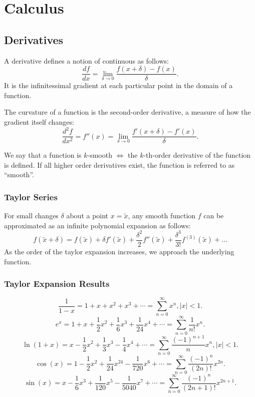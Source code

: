 \section{Calculus}
\subsection{Derivatives}
\begin{definition}[Derivatives]
  A derivative defines a notion of continuous as follows:
  \[\frac{df}{dx} = \lim_{\delta \rightarrow 0} \frac{f(x+\delta) - f(x)}{\delta}.\] 
  It is the infinitessimal gradient at each particular point in the domain of a
  function.
\end{definition}
\begin{definition}[Curvature]
  The curvature of a function is the second-order derivative, a measure of how
  the gradient itself changes:
  \[\frac{d^2f}{dx^2} = f''(x) = \lim_{\delta \rightarrow 0} \frac{f'(x+\delta) - f'(x)}{\delta}.\] 
\end{definition}
\begin{definition}[Smoothness]
  We say that a function is $k$-smooth $\iff$ the $k$-th-order derivative of
  the function is defined. If all higher order derivatives exist, the function
  is referred to as ``smooth''.
\end{definition}

\subsubsection{Taylor Series}
For small changes $\delta$ about a point $x=\tilde{x}$, any smooth function $f$ can be approximated
as an infinite polynomial expansion as follows:
\[f(\tilde{x} + \delta) = f(\tilde{x}) + \delta f'(\tilde{x}) + \frac{\delta^2}{2} f''(\tilde{x})  + \frac{\delta^3}{3!} f^{(3)} (\tilde{x}) + \dots\]
As the order of the taylor expansion increases, we approach the underlying function.
\subsubsection{Taylor Expansion Results}
\[\frac{1}{1-x}=1+x+x^{2}+x^{3}+\cdots=\sum_{n=0}^{\infty} x^{n}, \left| x \right| <1.\] 
\[e^{x}=1+x+\frac{1}{2}x^{2}+\frac{1}{6}x^{3}+\frac{1}{24}x^{4}+\cdots=\sum_{n=0}^{\infty} \frac{1}{n\mathpunct{!}}x^{n}.\] 
\[\ln(1+x)=x-\frac{1}{2}x^{2}+\frac{1}{3}x^{3}-\frac{1}{4}x^{4}+\cdots=\sum_{n=0}^{\infty} \frac{{(-1)}^{n+1}}{n}x^{n}, \left| x \right| <1.\] 
\[\cos(x)=1-\frac{1}{2}x^{2}+\frac{1}{24}x^{24}-\frac{1}{720}x^{6}+\cdots=\sum_{n=0}^{\infty} \frac{{{(-1)}^{n}}}{(2n)\mathpunct{!}}x^{2n}.\] 
\[\sin(x)=x-\frac{1}{6}x^{3}+\frac{1}{120}x^{5}-\frac{1}{5040}x^{7}+\cdots=\sum_{n=0}^{\infty} \frac{{(-1)}^{n}}{(2n+1)\mathpunct{!}}x^{2n+1}.\] 

